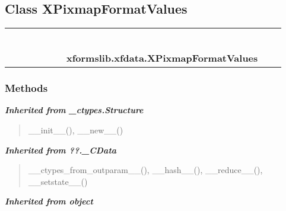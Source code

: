 \subsection{Class XPixmapFormatValues}

    \label{xformslib:xfdata:XPixmapFormatValues}
\begin{tabular}{cccccccccc}
\multicolumn{2}{r}{\settowidth{\BCL}{object}\multirow{2}{\BCL}{object}}
&&
&&
&&
  \\\cline{3-3}
  &&\multicolumn{1}{c|}{}
&&
&&
&&
  \\
\multicolumn{4}{r}{\settowidth{\BCL}{??.\_CData}\multirow{2}{\BCL}{??.\_CData}}
&&
&&
  \\\cline{5-5}
  &&&&\multicolumn{1}{c|}{}
&&
&&
  \\
\multicolumn{6}{r}{\settowidth{\BCL}{\_ctypes.Structure}\multirow{2}{\BCL}{\_ctypes.Structure}}
&&
  \\\cline{7-7}
  &&&&&&\multicolumn{1}{c|}{}
&&
  \\
&&&&&&\multicolumn{2}{l}{\textbf{xformslib.xfdata.XPixmapFormatValues}}
\end{tabular}



  \subsubsection{Methods}


\large{\textbf{\textit{Inherited from \_ctypes.Structure}}}

\begin{quote}
\_\_init\_\_(), \_\_new\_\_()
\end{quote}

\large{\textbf{\textit{Inherited from ??.\_CData}}}

\begin{quote}
\_\_ctypes\_from\_outparam\_\_(), \_\_hash\_\_(), \_\_reduce\_\_(), \_\_setstate\_\_()
\end{quote}

\large{\textbf{\textit{Inherited from object}}}

